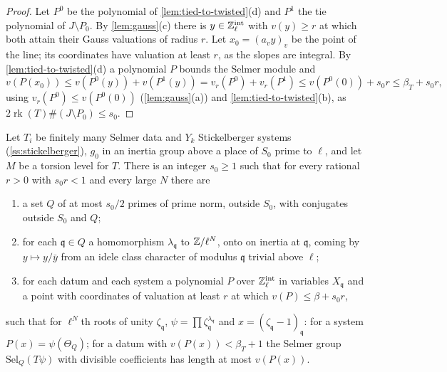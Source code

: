 \begin{proof}
Let $P^0$ be the polynomial of \cref{lem:tied-to-twisted}(d) and $P^1$ the tie polynomial of $J\setminus P_0$. By \cref{lem:gauss}(c) there is $y\in\mathbb{Z}_\ell^{\rm int}$ with $v(y)\ge r$ at which both attain their Gauss valuations of radius $r$. Let $x_0=(a_vy)_v$ be the point of the line; its coordinates have valuation at least
$r$, as the slopes are integral. By \cref{lem:tied-to-twisted}(d) a polynomial $P$ bounds the Selmer module and
\[v(P(x_0))\le v(P^0(y))+v(P^1(y))=v_r(P^0)+v_r(P^1)\le v(P^0(0))+s_0r\le\beta_T+s_0r,\]
using $v_r(P^0)\le v(P^0(0))$ (\cref{lem:gauss}(a)) and \cref{lem:tied-to-twisted}(b), as $2\operatorname{rk}(T)\#(J\setminus P_0)\le s_0$.
\end{proof}

\begin{theorem}\label{thm:twist-polynomials}
Let $T_i$ be finitely many Selmer data and $Y_k$ Stickelberger systems (\cref{ss:stickelberger}), $g_0$ in an inertia group above a place of $S_0$ prime to $\ell$, and let $M$ be a torsion level for $T$. There is an integer $s_0\ge1$
such that for every rational $r>0$ with $s_0r<1$ and every large $N$ there are
\begin{enumerate}[label=\textup{(\alph*)}]
\item a set $Q$ of at most $s_0/2$ primes of prime norm, outside $S_0$, with conjugates outside $S_0$ and $Q$;
\item for each $\mathfrak q\in Q$ a homomorphism $\lambda_{\mathfrak q}$ to $\mathbb{Z}/\ell^N$, onto on inertia at $\mathfrak q$, coming by $y\mapsto y/\bar y$ from an idele class character of modulus $\mathfrak q$ trivial above $\ell$;
\item for each datum and each system a polynomial $P$ over $\mathbb{Z}_\ell^{\rm int}$ in variables $X_{\mathfrak q}$ and a point with coordinates of valuation at least $r$ at which $v(P)\le\beta+s_0r$,
\end{enumerate}
such that for $\ell^N$th roots of unity $\zeta_{\mathfrak q}$, $\psi=\prod\zeta_{\mathfrak q}^{\lambda_{\mathfrak q}}$ and $x=(\zeta_{\mathfrak q}-1)_{\mathfrak q}$: for a system $P(x)=\psi(\Theta_Q)$; for a datum with $v(P(x))<\beta_T+1$ the Selmer group $\mathrm{Sel}_Q(T\psi)$ with divisible
coefficients has length at most $v(P(x))$.
\end{theorem}

